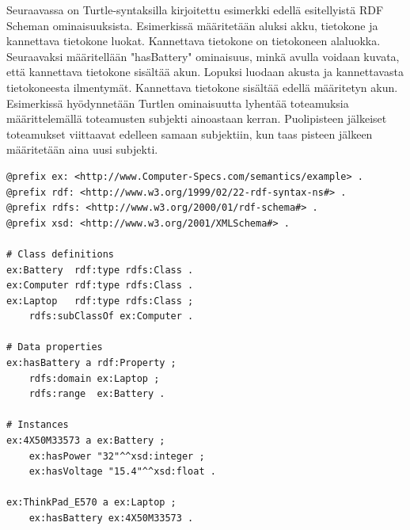 \documentclass[finnish, 12pt, a4paper, elec, utf8, pdfa, online]{aaltothesis}
\begin{document}
Seuraavassa on Turtle-syntaksilla kirjoitettu esimerkki edellä esitellyistä RDF Scheman ominaisuuksista. Esimerkissä määritetään aluksi akku, tietokone ja kannettava tietokone luokat. Kannettava tietokone on tietokoneen alaluokka. Seuraavaksi määritellään "hasBattery" ominaisuus, minkä avulla voidaan kuvata, että kannettava tietokone sisältää akun. Lopuksi luodaan akusta ja kannettavasta tietokoneesta ilmentymät. Kannettava tietokone sisältää edellä määritetyn akun. Esimerkissä hyödynnetään Turtlen ominaisuutta lyhentää toteamuksia määrittelemällä toteamusten subjekti ainoastaan kerran. Puolipisteen jälkeiset toteamukset viittaavat edelleen samaan subjektiin, kun taas pisteen jälkeen määritetään aina uusi subjekti.

\vskip 0.75cm
\begin{lstlisting}[style=codeblock]
@prefix ex: <http://www.Computer-Specs.com/semantics/example> .
@prefix rdf: <http://www.w3.org/1999/02/22-rdf-syntax-ns#> .
@prefix rdfs: <http://www.w3.org/2000/01/rdf-schema#> .
@prefix xsd: <http://www.w3.org/2001/XMLSchema#> .

# Class definitions
ex:Battery  rdf:type rdfs:Class .
ex:Computer rdf:type rdfs:Class .
ex:Laptop   rdf:type rdfs:Class ;
    rdfs:subClassOf ex:Computer .

# Data properties
ex:hasBattery a rdf:Property ;
    rdfs:domain ex:Laptop ;
    rdfs:range  ex:Battery .

# Instances
ex:4X50M33573 a ex:Battery ;
    ex:hasPower "32"^^xsd:integer ;
    ex:hasVoltage "15.4"^^xsd:float .

ex:ThinkPad_E570 a ex:Laptop ;
    ex:hasBattery ex:4X50M33573 .


\end{lstlisting}
\vskip 0.75cm

\begin{figure}[htb]
\centering


\end{figure}
\end{document}
